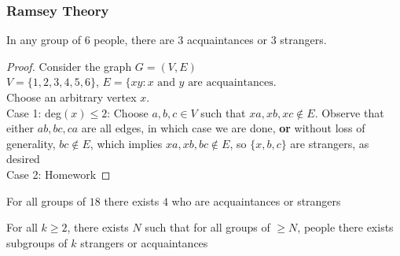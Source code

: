 \documentclass[11pt]{scrartcl}
\begin{document}
\subsubsection{Ramsey Theory}
\begin{theorem}
    In any group of $6$ people, there are $3$ acquaintances or $3$ strangers.
\end{theorem}
\begin{proof}
    Consider the graph $G = (V, E)$\\
    $V = \{1, 2, 3, 4, 5, 6\}$, $E = \{xy : x \text{ and } y \text{ are acquaintances} $.\\
    Choose an arbitrary vertex $x$. \\
    Case 1: deg$(x) \leq 2$: Choose $a, b, c \in V$ such that $xa, xb, xc \notin E$.  Observe that either $ab, bc, ca$ are all edges, in which case we are done, \textbf{or} without loss of generality, $bc \notin E$, which implies $xa, xb, bc \notin E$, so $\{x, b, c\}$ are strangers, as desired\\
    Case 2: Homework
\end{proof}
\begin{theorem}
    For all groups of $18 $ there exists $4$ who are acquaintances or strangers 
\end{theorem}
\begin{theorem}
    For all $k \geq 2$, there exists $N$ such that for all groups of $\geq N$, people there exists subgroups of $k$ strangers or acquaintances
\end{theorem}
\end{document}
